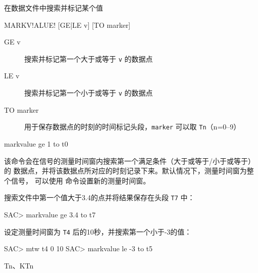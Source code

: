 \label{cmd:markvalue}

在数据文件中搜索并标记某个值

\begin{SACSTX}
MARKV!ALUE! [GE|LE v] [TO marker]
\end{SACSTX}

\begin{description}
\item [GE v] 搜索并标记第一个大于或等于 \texttt{v} 的数据点
\item [LE v] 搜索并标记第一个小于或等于 \texttt{v} 的数据点
\item [TO marker] 用于保存数据点的时刻的时间标记头段，\texttt{marker}
    可以取 \texttt{Tn}（n=0--9）
\end{description}

\begin{SACDFT}
markvalue ge 1 to t0
\end{SACDFT}

该命令会在信号的测量时间窗内搜索第一个满足条件（大于或等于/小于或等于）的
数据点，并将该数据点所对应的时刻记录下来。默认情况下，测量时间窗为整个信号，
可以使用  命令设置新的测量时间窗。

搜索文件中第一个值大于3.4的点并将结果保存在头段 \texttt{T7} 中：
\begin{SACCode}
SAC> markvalue ge 3.4 to t7
\end{SACCode}

设定测量时间窗为 \texttt{T4} 后的10秒，并搜索第一个小于-3的值：
\begin{SACCode}
SAC> mtw t4 0 10
SAC> markvalue le -3 to t5
\end{SACCode}

Tn、KTn
